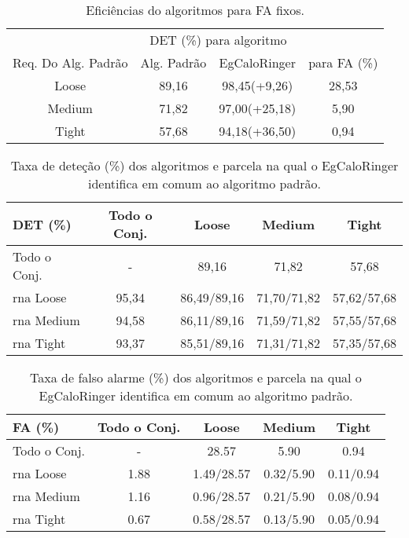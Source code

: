 \begin{table}[ht!]
\centering
\begin{tabular}{cccc}
\hline
\hline
 & 
\multicolumn{2}{c}{DET (\%) para algoritmo} & 
\\
\cline{2-3}
\multirow{-2}{*}{Req. Do Alg. Padrão} & 
Alg. Padrão & 
EgCaloRinger & 
\multirow{-2}{*}{para FA (\%)} \\
\hline
Loose & 89,16 & 98,45(+9,26) & 28,53 \\
Medium & 71,82 & 97,00(+25,18) & 5,90 \\
Tight & 57,68 & 94,18(+36,50) & 0,94 \\
\hline
\hline
\end{tabular}
\caption{Eficiências do algoritmos para FA fixos.}
\end{table}

\begin{table}[ht!]
\centering
\begin{tabular}{l cccc}
\hline
\hline
DET (\%)& Todo o Conj. & Loose & Medium & Tight \\
\hline
Todo o Conj. &  - & 89,16 & 71,82 & 57,68 \\
\hline
\gls{rna} Loose & 95,34 & 86,49/89,16 & 71,70/71,82 & 57,62/57,68 \\
\hline
\gls{rna} Medium & 94,58  & 86,11/89,16 & 71,59/71,82 & 57,55/57,68 \\
\hline
\gls{rna} Tight &  93,37 & 85,51/89,16 &  71,31/71,82 & 57,35/57,68 \\
\hline
\hline
\end{tabular}
\caption{Taxa de deteção (\%) dos algoritmos e parcela na qual o EgCaloRinger
identifica em comum ao algoritmo padrão.}
\end{table}

\begin{table}[ht!]
\centering
\begin{tabular}{l cccc}
\hline
\hline
FA (\%)& Todo o Conj. & Loose & Medium & Tight \\
\hline
Todo o Conj. & - & 28.57 & 5.90 &  0.94 \\
\gls{rna} Loose  & 1.88  & 1.49/28.57 & 0.32/5.90 & 0.11/0.94 \\
\gls{rna} Medium & 1.16  & 0.96/28.57 & 0.21/5.90 & 0.08/0.94 \\
\gls{rna} Tight  & 0.67  & 0.58/28.57 & 0.13/5.90 & 0.05/0.94 \\
\hline
\hline
\end{tabular}
\caption{Taxa de falso alarme (\%) dos algoritmos e parcela na qual o EgCaloRinger
identifica em comum ao algoritmo padrão.}
\end{table}





